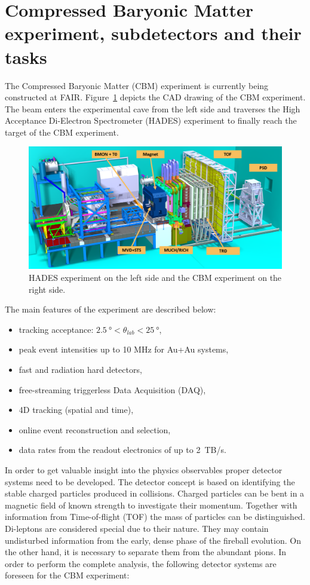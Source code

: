 

\section{Compressed Baryonic Matter experiment, subdetectors and their tasks}
The Compressed Baryonic Matter (\gls{CBM}) experiment is currently being constructed at \gls{FAIR}. Figure~\ref{fig:exp} depicts the CAD drawing of the \gls{CBM} experiment. The beam enters the experimental cave from the left side and traverses the High Acceptance Di-Electron Spectrometer (\gls{HADES}) experiment to finally reach the target of the \gls{CBM} experiment. 

\begin{figure}[!h]
    \centering
    \includegraphics[width=1\columnwidth]{Chapter1/images/CBMnew.png}
    \caption{HADES experiment on the left side and the \gls{CBM} experiment on the right side.}
    \label{fig:exp}
\end{figure}

The main features of the experiment are described below:
\begin{itemize}
\item tracking acceptance: $\SI{2.5}{\degree} < \theta_{lab} < \SI{25}{\degree}$,
\item peak event intensities up to 10 MHz for Au+Au systems,
\item fast and radiation hard detectors,
\item free-streaming triggerless Data Acquisition (\gls{DAQ}),
\item 4D tracking (spatial and time),
\item online event reconstruction and selection,
\item data rates from the readout electronics of up to 2~TB/s.
\end{itemize}


In order to get valuable insight into the physics observables proper detector systems need to be developed. The detector concept is based on identifying the stable charged particles produced in collisions. Charged particles can be bent in a magnetic field of known strength to investigate their momentum. Together with information from Time-of-flight (\gls{TOF}) the mass of particles can be distinguished. Di-leptons are considered special due to their nature. They may contain undisturbed information from the early, dense phase of the fireball evolution. On the other hand, it is necessary to separate them from the abundant pions. In order to perform the complete analysis, the following detector systems are foreseen for the \gls{CBM} experiment:\bigbreak


